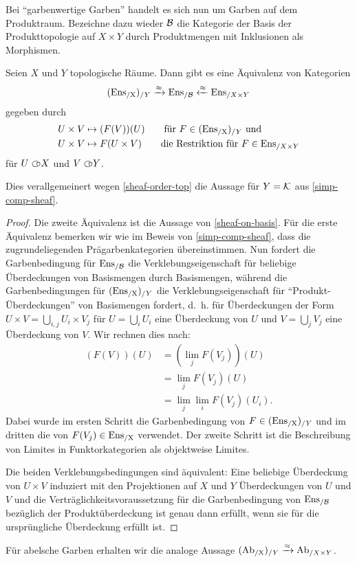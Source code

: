 Bei ``garbenwertige Garben'' handelt es sich nun um Garben auf dem
Produktraum. Bezeichne dazu wieder $\mathcal{B}$ die Kategorie der Basis der
Produkttopologie auf $X \times Y$ durch Produktmengen mit Inklusionen
als Morphismen.
\begin{satz} \label{sheaves-prod-topos}
  Seien $X$ und $Y$ topologische Räume. Dann gibt es eine Äquivalenz
  von Kategorien
  \[ (\operatorname{Ens_{/X}})_{/Y} \xrightarrow{\approx} \operatorname{Ens}_{/\mathcal{B}} \xleftarrow{\approx} \operatorname{Ens}_{/X \times Y} \]
  gegeben durch
  \begin{align*}
    U \times V &\mapsto (F(V))(U) \qquad
    \text{für } F \in (\operatorname{Ens_{/X}})_{/Y} \text{ und} \\
     U \times V &\mapsto F(U \times V) \qquad
     \text{die Restriktion für } F \in \operatorname{Ens}_{/X \times Y}
  \end{align*}
  für $U \subset\kern-0.58em\circ X$ und $V \subset\kern-0.58em\circ Y$.
\end{satz}
\begin{bem}
  Dies verallgemeinert wegen \ref{sheaf-order-top} die Aussage für $Y
  = \mathcal{K}$ aus \ref{simp-comp-sheaf}.
\end{bem}
\begin{proof}
  Die zweite Äquivalenz ist die Aussage von \ref{sheaf-on-basis}. Für
  die erste Äquivalenz bemerken wir wie im Beweis von
  \ref{simp-comp-sheaf}, dass die zugrundeliegenden
  Prägarbenkategorien übereinstimmen. Nun fordert die Garbenbedingung
  für $\operatorname{Ens}_{/\mathcal{B}}$ die Verklebungseigenschaft für beliebige
  Überdeckungen von Basismengen durch Basismengen, während die
  Garbenbedingungen für $(\operatorname{Ens_{/X}})_{/Y}$ die Verklebungseigenschaft für
  ``Produkt-Überdeckungen'' von Basismengen fordert, d.~h. für
  Überdeckungen der Form $U \times V = \bigcup_{i,j} U_i \times V_j$
  für $U = \bigcup_i U_i$ eine Überdeckung von $U$ und $V = \bigcup_j
  V_j$ eine Überdeckung von $V$. Wir rechnen dies nach:
  \begin{align*}
    (F(V))(U)
    &= (\lim_j F(V_j))(U) \\
    &= \lim_j F(V_j)(U) \\
    &= \lim_j \lim_i F(V_j)(U_i).
  \end{align*}
  Dabei wurde im ersten Schritt die Garbenbedingung von $F \in
  (\operatorname{Ens_{/X}})_{/Y}$ und im dritten die von $F(V_j) \in \operatorname{Ens_{/X}}$
  verwendet. Der zweite Schritt ist die Beschreibung von Limites in
  Funktorkategorien als objektweise Limites.

  Die beiden Verklebungsbedingungen sind äquivalent: Eine beliebige
  Überdeckung von $U \times V$ induziert mit den Projektionen auf $X$
  und $Y$ Überdeckungen von $U$ und $V$ und die
  Verträglichkeitsvoraussetzung für die Garbenbedingung von
  $\operatorname{Ens}_{/\mathcal{B}}$ bezüglich der Produktüberdeckung ist genau dann
  erfüllt, wenn sie für die ursprüngliche Überdeckung erfüllt ist.
\end{proof}
\begin{bem}
  Für abelsche Garben erhalten wir die analoge Aussage $(\operatorname{Ab_{/X}})_{/Y}
  \xrightarrow{\approx} \operatorname{Ab}_{/X \times Y}$.
\end{bem}

